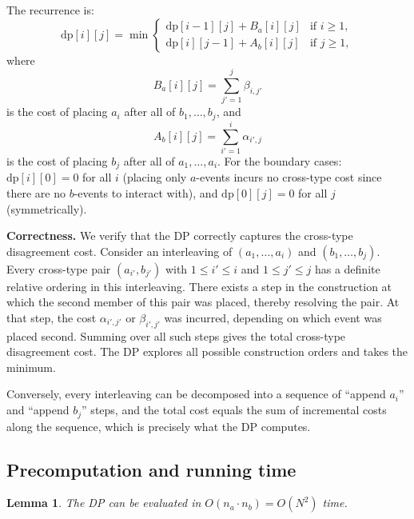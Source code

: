 \documentclass[11pt]{article}
\newtheorem{lemma}[theorem]{Lemma}
\begin{document}
The recurrence is:
\begin{equation}\label{eq:recurrence}
\mathrm{dp}[i][j] = \min \begin{cases}
\mathrm{dp}[i-1][j] + B_a[i][j] & \text{if } i \ge 1, \\[2pt]
\mathrm{dp}[i][j-1] + A_b[i][j] & \text{if } j \ge 1,
\end{cases}
\end{equation}
where
\begin{equation}\label{eq:prefix-Ba}
B_a[i][j] = \sum_{j'=1}^{j} \beta_{i,j'}
\end{equation}
is the cost of placing $a_i$ after all of $b_1, \ldots, b_j$, and
\begin{equation}\label{eq:prefix-Ab}
A_b[i][j] = \sum_{i'=1}^{i} \alpha_{i',j}
\end{equation}
is the cost of placing $b_j$ after all of $a_1, \ldots, a_i$. For the boundary cases: $\mathrm{dp}[i][0] = 0$ for all $i$ (placing only $a$-events incurs no cross-type cost since there are no $b$-events to interact with), and $\mathrm{dp}[0][j] = 0$ for all $j$ (symmetrically).

\smallskip
\noindent\textbf{Correctness.} We verify that the DP correctly captures the cross-type disagreement cost. Consider an interleaving of $(a_1, \ldots, a_i)$ and $(b_1, \ldots, b_j)$. Every cross-type pair $(a_{i'}, b_{j'})$ with $1 \le i' \le i$ and $1 \le j' \le j$ has a definite relative ordering in this interleaving. There exists a step in the construction at which the second member of this pair was placed, thereby resolving the pair. At that step, the cost $\alpha_{i',j'}$ or $\beta_{i',j'}$ was incurred, depending on which event was placed second. Summing over all such steps gives the total cross-type disagreement cost. The DP explores all possible construction orders and takes the minimum.

Conversely, every interleaving can be decomposed into a sequence of ``append $a_i$'' and ``append $b_j$'' steps, and the total cost equals the sum of incremental costs along the sequence, which is precisely what the DP computes.

\subsection{Precomputation and running time}

\begin{lemma}\label{lem:time}
The DP can be evaluated in $O(n_a \cdot n_b) = O(N^2)$ time.
\end{lemma}
\end{document}
